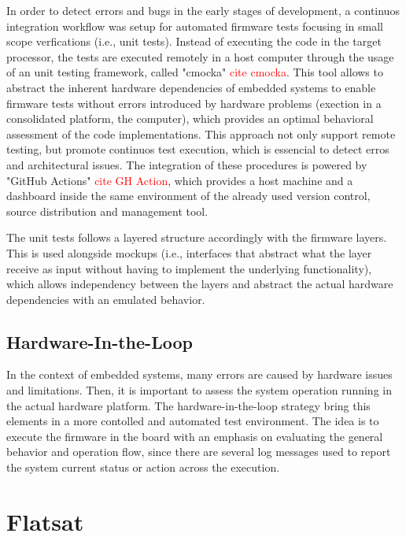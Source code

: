 In order to detect errors and bugs in the early stages of development, a continuos integration workflow was setup for automated firmware tests focusing in small scope verfications (i.e., unit tests). Instead of executing the code in the target processor, the tests are executed remotely in a host computer through the usage of an unit testing framework, called "cmocka" \textcolor{red}{cite cmocka}. This tool allows to abstract the inherent hardware dependencies of embedded systems to enable firmware tests without errors introduced by hardware problems (exection in a consolidated platform, the computer), which provides an optimal behavioral assessment of the code implementations. This approach not only support remote testing, but promote continuos test execution, which is essencial to detect erros and architectural issues. The integration of these procedures is powered by "GitHub Actions" \textcolor{red}{cite GH Action}, which provides a host machine and a dashboard inside the same environment of the already used version control, source distribution and management tool.

The unit tests follows a layered structure accordingly with the firmware layers. This is used alongside mockups (i.e., interfaces that abstract what the layer receive as input without having to implement the underlying functionality), which allows independency between the layers and abstract the actual hardware dependencies with an emulated behavior.

\subsection{Hardware-In-the-Loop}

In the context of embedded systems, many errors are caused by hardware issues and limitations. Then, it is important to assess the system operation running in the actual hardware platform. The hardware-in-the-loop strategy bring this elements in a more contolled and automated test environment. The idea is to execute the firmware in the board with an emphasis on evaluating the general behavior and operation flow, since there are several log messages used to report the system current status or action across the execution.


\section{Flatsat}

